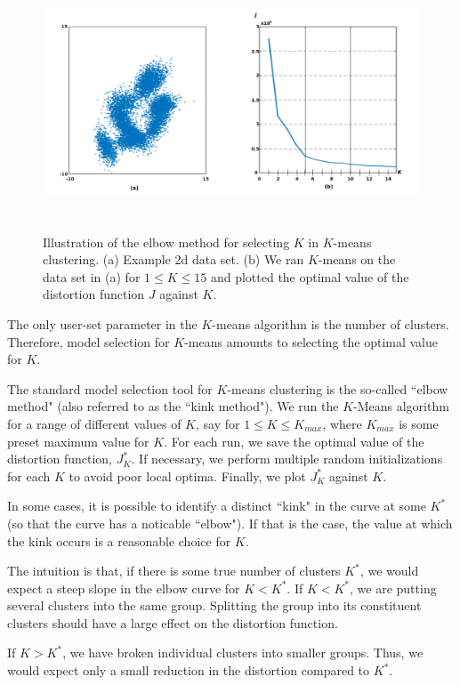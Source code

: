 \documentclass[final,3p,times,twocolumn]{elsarticle}
\begin{document}
\begin{figure}
\centering
\includegraphics[width=\textwidth,height=3in]{elbow.png}
\caption{Illustration of the elbow method for selecting $K$ in $K$-means clustering. 
(a) Example 2d data set.
(b) We ran $K$-means on the data set in (a) for $1\leq K\leq 15$ and plotted the optimal value of the distortion function $J$ against $K$.}
\label{fig:kmeans-elbow}
\end{figure}

The only user-set parameter in the $K$-means algorithm is the number of clusters.
Therefore, model selection for $K$-means amounts to selecting the optimal value for $K$.

The standard model selection tool for $K$-means clustering is the so-called ``elbow method" (also referred to as the ``kink method").
We run the $K$-Means algorithm for a range of different values of $K$, say for $1 \leq K \leq K_{max}$, where $K_{max}$ is some preset maximum value for $K$.
For each run, we save the optimal value of the distortion function, $J^*_K$.
If necessary, we perform multiple random initializations for each $K$ to avoid poor local optima.
Finally, we plot $J_K^*$ against $K$.

In some cases, it is possible to identify a distinct ``kink" in the curve at some $K^*$ (so that the curve has a noticable ``elbow").
If that is the case, the value at which the kink occurs is a reasonable choice for $K$. 

The intuition is that, if there is some true number of clusters $K^*$, we would expect a steep slope in the elbow curve for $K < K^*$.
If $K < K^*$, we are putting several clusters into the same group. 
Splitting the group into its constituent clusters should have a large effect on the distortion function.

If $K > K^*$, we have broken individual clusters into smaller groups.
Thus, we would expect only a small reduction in the distortion compared to $K^*$.
\end{document}
